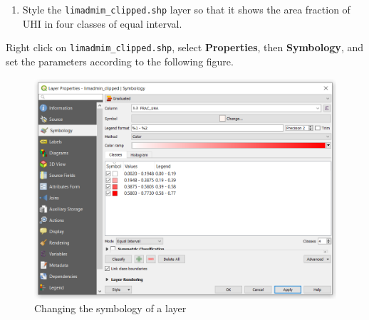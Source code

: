 \documentclass[]{book}
\providecommand{\tightlist}{%
  \setlength{\itemsep}{0pt}\setlength{\parskip}{0pt}}
\theoremstyle{definition}
\theoremstyle{definition}
\theoremstyle{definition}
\theoremstyle{remark}
\begin{document}
\begin{enumerate}
\def\labelenumi{\arabic{enumi}.}
\setcounter{enumi}{9}
\tightlist
\item
  Style the \texttt{limadmim\_clipped.shp} layer so that it shows the
  area fraction of UHI in four classes of equal interval.
\end{enumerate}

Right click on \texttt{limadmim\_clipped.shp}, select
\textbf{Properties}, then \textbf{Symbology}, and set the parameters
according to the following figure.

\begin{figure}

{\centering \includegraphics[width=14.17in]{figures/Area_Fraction_UHA} 

}

\caption{Changing the symbology of a layer}\label{fig:unnamed-chunk-38}
\end{figure}


\end{document}
